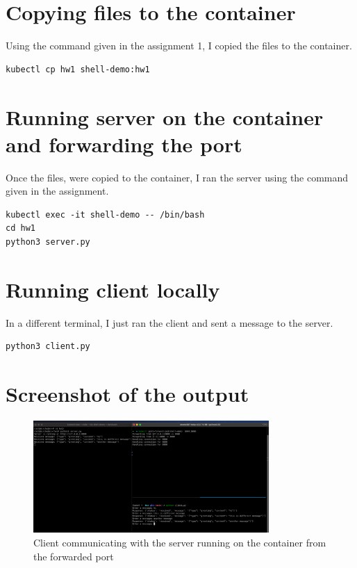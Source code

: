 \documentclass{article}
\begin{document}
\section*{Copying files to the container}

Using the command given in the assignment 1, I copied the files to the container.


\begin{lstlisting}
kubectl cp hw1 shell-demo:hw1
\end{lstlisting}




\section*{Running server on the container and forwarding the port}

Once the files, were copied to the container, I ran the server using the command given in the assignment.

\begin{lstlisting}
kubectl exec -it shell-demo -- /bin/bash
cd hw1
python3 server.py
\end{lstlisting}

\section*{Running client locally}

In a different terminal, I just ran the client and sent a message to the server.

\begin{lstlisting}
python3 client.py
\end{lstlisting}

\section*{Screenshot of the output}

\begin{figure}[ht]
    \centering
    \includegraphics[width=0.8\textwidth]{output.png}
    \caption{Client communicating with the server running on the container from the forwarded port}
\end{figure}
\end{document}
